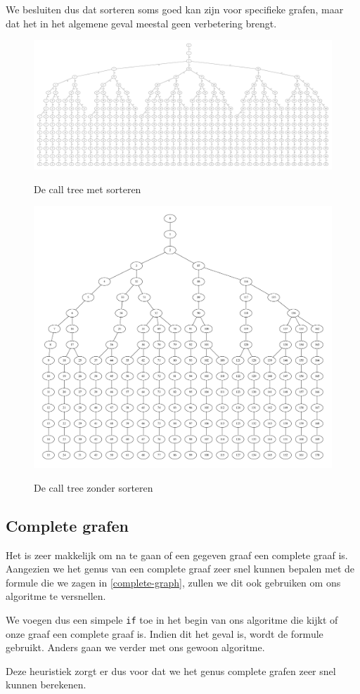 \documentclass{article}
\begin{document}
We besluiten dus dat sorteren soms goed kan zijn voor specifieke grafen,
maar dat het in het algemene geval meestal geen verbetering brengt.

\begin{figure}
\begin{center}
\includegraphics[width=\textwidth]{images/sorted-call-tree.pdf}
\caption{De call tree met sorteren}
\label{fig:sorted-call-tree}
\includegraphics[width=\textwidth]{images/default-call-tree.pdf}
\caption{De call tree zonder sorteren}
\label{fig:default-call-tree}
\end{center}
\end{figure}

\subsection{Complete grafen}
\label{heuristiek-complete-grafen}
Het is zeer makkelijk om na te gaan of een gegeven graaf een complete graaf is.
Aangezien we het genus van een complete graaf zeer snel kunnen bepalen met de
formule die we zagen in \ref{complete-graph}, zullen we dit ook gebruiken om
ons algoritme te versnellen.
\newline

We voegen dus een simpele \verb#if# toe in het begin van ons algoritme die kijkt
of onze graaf een complete graaf is. Indien dit het geval is, wordt de formule
gebruikt. Anders gaan we verder met ons gewoon algoritme.
\newline

Deze heuristiek zorgt er dus voor dat we het genus complete grafen zeer snel 
kunnen berekenen.
\end{document}
